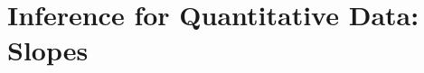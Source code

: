 \documentclass[../stats.tex]{subfiles}
\begin{document}
\chapter{Inference for Quantitative Data: Slopes}
\end{document}

